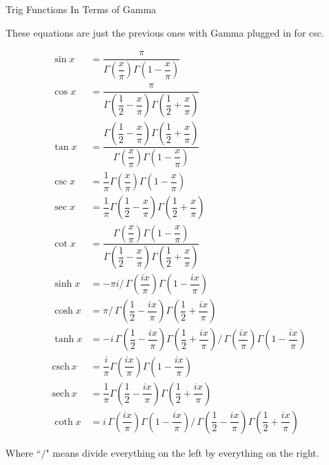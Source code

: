 \documentclass[12pt]{article}
\begin{document}
\pagebreak\begin{section}{Trig Functions In Terms of Gamma}

	\noindent These equations are just the previous ones with Gamma plugged in for csc.

	\begin{align} %
		\sin x & =\dfrac\pi{\Gamma\left(\dfrac x\pi\right)\Gamma\left(1-\dfrac x\pi\right)}\\
		\cos x & =\dfrac\pi{\Gamma\left(\dfrac12-\dfrac x\pi\right)\Gamma\left(\dfrac12+\dfrac x
		\pi\right)}\\
		\tan x & =\dfrac{\Gamma\left(\dfrac12-\dfrac x\pi\right)\Gamma\left(\dfrac12+\dfrac x\pi
		\right)}{\Gamma\left(\dfrac x\pi\right)\Gamma\left(1-\dfrac x\pi\right)}\\
		\csc x & =\dfrac1\pi\Gamma\left(\dfrac x\pi\right)\Gamma\left(1-\dfrac x\pi\right)\\
		\sec x & =\dfrac1\pi\Gamma\left(\dfrac12-\dfrac x\pi\right)\Gamma\left(\dfrac12+\dfrac x
		\pi\right)\\
		\cot x & =\dfrac{\Gamma\left(\dfrac x\pi\right)\Gamma\left(1-\dfrac x\pi\right)}{\Gamma
		\left(\dfrac12-\dfrac x\pi\right)\Gamma\left(\dfrac12+\dfrac x\pi\right)}\\
		\sinh x & =-\pi i\big/\,\Gamma\left(\dfrac{ix}\pi\right)\Gamma\left(1-\dfrac{ix}\pi
		\right)\\
		\cosh x & =\pi\big/\,\Gamma\left(\dfrac12-\dfrac{ix}\pi\right)\Gamma\left(\dfrac12+
		\dfrac{ix}\pi\right)\\
		\tanh x & =-i\,\Gamma\left(\dfrac12-\dfrac{ix}\pi\right)\Gamma\left(\dfrac12+
		\dfrac{ix}\pi\right)\big/\,\Gamma\left(\dfrac{ix}\pi\right)\Gamma\left(1-
		\dfrac{ix}\pi\right)\\
		\text{csch}\,x & =\dfrac i\pi\Gamma\left(\dfrac{ix}\pi\right)\Gamma\left(1-
		\dfrac{ix}\pi\right)\\
		\text{sech}\,x & =\dfrac1\pi\Gamma\left(\dfrac12-\dfrac{ix}\pi\right)\Gamma\left(
		\dfrac12+\dfrac{ix}\pi\right)\\
		\coth x & =i\,\Gamma\left(\dfrac{ix}\pi\right)\Gamma\left(1-\dfrac{ix}\pi\right)\big/
		\,\Gamma\left(\dfrac12-\dfrac{ix}\pi\right)\Gamma\left(\dfrac12+\dfrac{ix}\pi\right)
	\end{align}

	\noindent Where ``$\big/$" means divide everything on the left by everything on the right.
\end{section}
\end{document}
